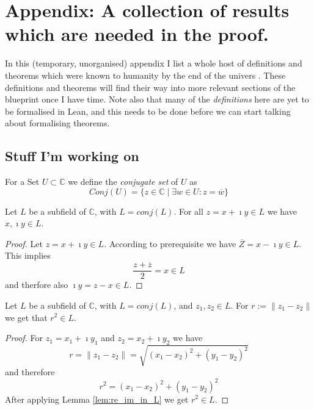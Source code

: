 \chapter{Appendix: A collection of results which are needed in the proof.}
\label{ch_bestiary}
In this (temporary, unorganised) appendix I list a whole host of definitions and theorems which were known to humanity by the end of the univers \cite{JAN_SCHRÖER:2023}. These definitions and theorems will find their way into more relevant sections of the blueprint once I have time. Note also that many of the \emph{definitions} here are yet to be formalised in Lean, and this needs to be done before we can start talking about formalising theorems.


\section*{Stuff I'm working on}



\begin{definition}
    \label{def:conjugate_set}
    For a Set $U \subset \mathbb{C}$ we define the \emph{conjugate set} of $U$ as 
    \begin{equation*}
        Conj(U) = \{z\in \mathbb{C} \mid \exists w\in U: z = \overline{w}\}
    \end{equation*}
\end{definition}

\begin{lemma}
    \label{lem:re_im_in_L}
    Let $L$ be a subfield of $\mathbb{C}$, with $L = conj(L)$. For all $z = x + \imath y \in L$ we have $x, \imath y \in L$.
\end{lemma}
\begin{proof}
    Let $z = x + \imath y \in L$. According to prerequisite we have $\overline{Z}=x-\imath y \in L$. This implies
    \begin{equation*}
        \frac{z + \overline{z}}{2} = x \in L
    \end{equation*}
    and therfore also $\imath y = z - x \in L$.
\end{proof}

\begin{lemma}
    \label{lem:dist_sqard_in_L}
    Let $L$ be a subfield of $\mathbb{C}$, with $L = conj(L)$, and $z_1, z_2 \in L$.
    For $r := \|z_1-z_2\|$ we get that $r^2 \in L$.
\end{lemma}
\begin{proof}
    For $z_1 = x_1 + \imath y_1$ and $z_2 = x_2 + \imath y_2$ we have
    \begin{equation*}
        r = \|z_1 - z_2\| = \sqrt{(x_1 - x_2)^2 + (y_1 - y_2)^2}
    \end{equation*}
    and therefore
    \begin{equation*}
        r^2 = (x_1 - x_2)^2 + (y_1 - y_2)^2 
    \end{equation*}
    After applying Lemma \ref{lem:re_im_in_L} we get $r^2 \in L$.
\end{proof}

